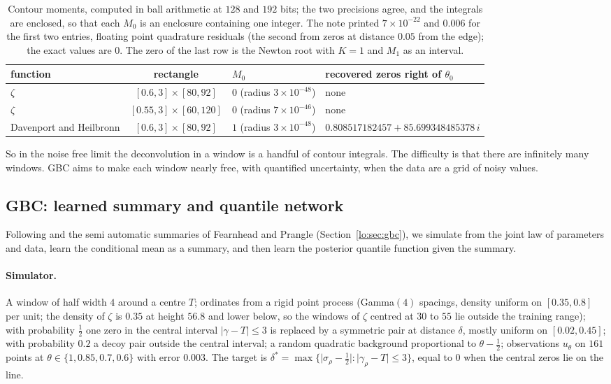 \begin{table}[h]
\centering
\small\setlength{\tabcolsep}{4pt}\begin{tabular}{p{0.9in}cp{0.95in}p{1.4in}}
\toprule
function & rectangle & $M_0$ & recovered zeros right of $\theta_0$\\
\midrule
$\zeta$ & $[0.6,3]\times[80,92]$ & $0$ (radius $3\times10^{-48}$) & none\\
$\zeta$ & $[0.55,3]\times[60,120]$ & $0$ (radius $7\times10^{-46}$) & none\\
Davenport and Heilbronn & $[0.6,3]\times[80,92]$ & $1$ (radius $3\times10^{-48}$) & $0.808517182457+\allowbreak85.699348485378\,i$\\
\bottomrule
\end{tabular}
\caption{Contour moments, computed in ball arithmetic at $128$ and $192$ bits; the two precisions agree, and the integrals are enclosed, so that each $M_0$ is an enclosure containing one integer. The note printed $7\times10^{-22}$ and $0.006$ for the first two entries, floating point quadrature residuals (the second from zeros at distance $0.05$ from the edge); the exact values are $0$. The zero of the last row is the Newton root with $K=1$ and $M_1$ as an interval.}
\label{cf:tab:dl}
\end{table}

So in the noise free limit the deconvolution in a window is a handful of contour integrals. The difficulty is that there are infinitely many windows. GBC aims to make each window nearly free, with quantified uncertainty, when the data are a grid of noisy values.

\subsection{GBC: learned summary and quantile network}

Following \cite{PS23} and the semi automatic summaries of Fearnhead and Prangle \cite{FP12} (Section~\ref{lo:sec:gbc}), we simulate from the joint law of parameters and data, learn the conditional mean as a summary, and then learn the posterior quantile function given the summary.

\paragraph{Simulator.} A window of half width $4$ around a centre $T$; ordinates from a rigid point process (Gamma$(4)$ spacings, density uniform on $[0.35,0.8]$ per unit; the density of $\zeta$ is $0.35$ at height $56.8$ and lower below, so the windows of $\zeta$ centred at $30$ to $55$ lie outside the training range); with probability $\frac12$ one zero in the central interval $\lvert\gamma-T\rvert\le3$ is replaced by a symmetric pair at distance $\delta$, mostly uniform on $[0.02,0.45]$; with probability $0.2$ a decoy pair outside the central interval; a random quadratic background proportional to $\theta-\frac12$; observations $u_\theta$ on $161$ points at $\theta\in\{1,0.85,0.7,0.6\}$ with error $0.003$. The target is $\delta^\ast=\max\{\lvert\sigma_\rho-\frac12\rvert:\lvert\gamma_\rho-T\rvert\le3\}$, equal to $0$ when the central zeros lie on the line.

